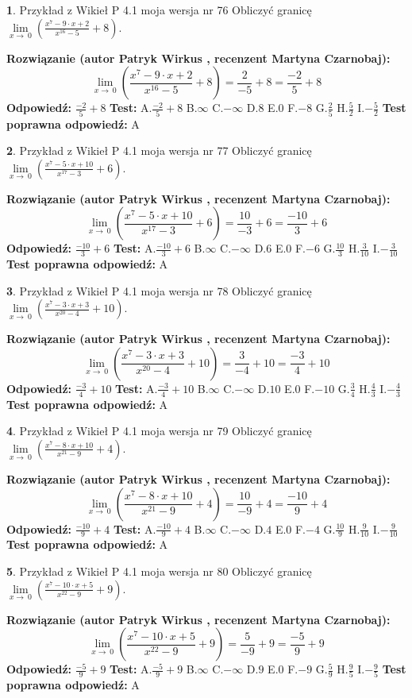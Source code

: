 \documentclass[12pt, a4paper]{article}
\theoremstyle{definition} %
\newtheorem{zad}{}
\newcommand{\zadStart}[1]{\begin{zad}#1\newline}
\newcommand{\zadStop}{\end{zad}}
\newcommand{\rozwStart}[2]{\noindent \textbf{Rozwiązanie (autor #1 , recenzent #2): }\newline}
\newcommand{\rozwStop}{\newline}
\newcommand{\odpStart}{\noindent \textbf{Odpowiedź:}\newline}
\newcommand{\odpStop}{\newline}
\newcommand{\testStart}{\noindent \textbf{Test:}\newline}
\newcommand{\testStop}{\newline}
\newcommand{\kluczStart}{\noindent \textbf{Test poprawna odpowiedź:}\newline}
\newcommand{\kluczStop}{\newline}
\begin{document}
\zadStart{Przykład z Wikieł P 4.1 moja wersja nr 76}
Obliczyć granicę $\lim\limits_{x\to\ 0}(\frac{x^{7}-9 \cdot x +2}{x^{16}-5}+8)$.
\zadStop
\rozwStart{Patryk Wirkus}{Martyna Czarnobaj}
$$\lim\limits_{x\to\ 0}(\frac{x^{7}-9 \cdot x +2}{x^{16}-5}+8)=\frac{2}{-5}+8=\frac{-2}{5}+8$$
\rozwStop
\odpStart
$\frac{-2}{5}+8$
\odpStop
\testStart
A.$\frac{-2}{5}+8$
B.$\infty$
C.$-\infty$
D.$8$
E.$0$
F.$-8$
G.$\frac{2}{5}$
H.$\frac{5}{2}$
I.$-\frac{5}{2}$
\testStop
\kluczStart
A
\kluczStop



\zadStart{Przykład z Wikieł P 4.1 moja wersja nr 77}
Obliczyć granicę $\lim\limits_{x\to\ 0}(\frac{x^{7}-5 \cdot x +10}{x^{17}-3}+6)$.
\zadStop
\rozwStart{Patryk Wirkus}{Martyna Czarnobaj}
$$\lim\limits_{x\to\ 0}(\frac{x^{7}-5 \cdot x +10}{x^{17}-3}+6)=\frac{10}{-3}+6=\frac{-10}{3}+6$$
\rozwStop
\odpStart
$\frac{-10}{3}+6$
\odpStop
\testStart
A.$\frac{-10}{3}+6$
B.$\infty$
C.$-\infty$
D.$6$
E.$0$
F.$-6$
G.$\frac{10}{3}$
H.$\frac{3}{10}$
I.$-\frac{3}{10}$
\testStop
\kluczStart
A
\kluczStop



\zadStart{Przykład z Wikieł P 4.1 moja wersja nr 78}
Obliczyć granicę $\lim\limits_{x\to\ 0}(\frac{x^{7}-3 \cdot x +3}{x^{20}-4}+10)$.
\zadStop
\rozwStart{Patryk Wirkus}{Martyna Czarnobaj}
$$\lim\limits_{x\to\ 0}(\frac{x^{7}-3 \cdot x +3}{x^{20}-4}+10)=\frac{3}{-4}+10=\frac{-3}{4}+10$$
\rozwStop
\odpStart
$\frac{-3}{4}+10$
\odpStop
\testStart
A.$\frac{-3}{4}+10$
B.$\infty$
C.$-\infty$
D.$10$
E.$0$
F.$-10$
G.$\frac{3}{4}$
H.$\frac{4}{3}$
I.$-\frac{4}{3}$
\testStop
\kluczStart
A
\kluczStop



\zadStart{Przykład z Wikieł P 4.1 moja wersja nr 79}
Obliczyć granicę $\lim\limits_{x\to\ 0}(\frac{x^{7}-8 \cdot x +10}{x^{21}-9}+4)$.
\zadStop
\rozwStart{Patryk Wirkus}{Martyna Czarnobaj}
$$\lim\limits_{x\to\ 0}(\frac{x^{7}-8 \cdot x +10}{x^{21}-9}+4)=\frac{10}{-9}+4=\frac{-10}{9}+4$$
\rozwStop
\odpStart
$\frac{-10}{9}+4$
\odpStop
\testStart
A.$\frac{-10}{9}+4$
B.$\infty$
C.$-\infty$
D.$4$
E.$0$
F.$-4$
G.$\frac{10}{9}$
H.$\frac{9}{10}$
I.$-\frac{9}{10}$
\testStop
\kluczStart
A
\kluczStop



\zadStart{Przykład z Wikieł P 4.1 moja wersja nr 80}
Obliczyć granicę $\lim\limits_{x\to\ 0}(\frac{x^{7}-10 \cdot x +5}{x^{22}-9}+9)$.
\zadStop
\rozwStart{Patryk Wirkus}{Martyna Czarnobaj}
$$\lim\limits_{x\to\ 0}(\frac{x^{7}-10 \cdot x +5}{x^{22}-9}+9)=\frac{5}{-9}+9=\frac{-5}{9}+9$$
\rozwStop
\odpStart
$\frac{-5}{9}+9$
\odpStop
\testStart
A.$\frac{-5}{9}+9$
B.$\infty$
C.$-\infty$
D.$9$
E.$0$
F.$-9$
G.$\frac{5}{9}$
H.$\frac{9}{5}$
I.$-\frac{9}{5}$
\testStop
\kluczStart
A
\kluczStop
\end{document}
